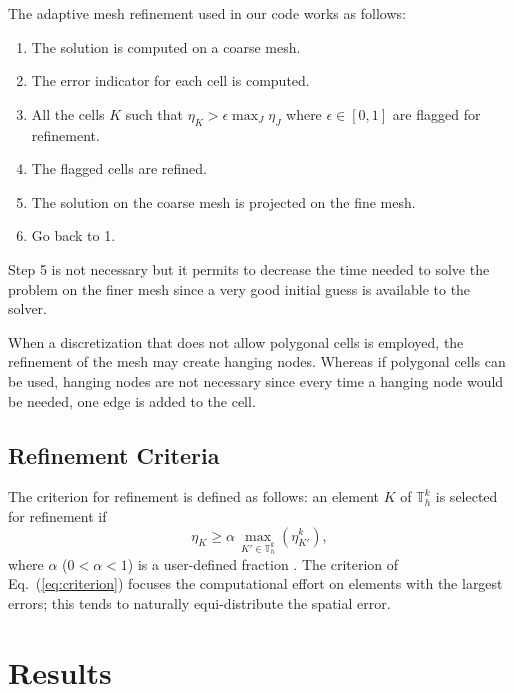\documentclass[preprint,10pt]{elsarticle}
\newcommand{\be}{\begin{equation}}
\newcommand{\ee}{\end{equation}}
\newcommand{\eqt}[1]{Eq.~(\ref{#1})}                     %
\renewcommand{\(}{\left(}
\renewcommand{\)}{\right)}
\renewcommand{\[}{\left[}
\renewcommand{\]}{\right]}
\begin{document}
The adaptive mesh refinement used in our code works as follows:
\begin{enumerate}
  \item The solution is computed on a coarse mesh.
  \item The error indicator for each cell is computed.
  \item All the cells $K$ such that $\eta_K > \epsilon \max_{J} \eta_J$ where
    $\epsilon \in [0,1]$ are flagged for refinement.
  \item The flagged cells are refined.
  \item The solution on the coarse mesh is projected on the fine mesh.
  \item Go back to 1.
\end{enumerate}
Step 5 is not necessary but it permits to decrease the time needed to solve
the problem on the finer mesh since a very good initial guess is available to
the solver.

When a discretization that does not allow polygonal cells is employed, the
refinement of the mesh may create hanging nodes. Whereas if polygonal cells can
be used, hanging nodes are not necessary since every time a hanging node
would be needed, one edge is added to the cell.


\subsection{Refinement Criteria} \label{sec:error4}

The criterion for refinement is defined as follows: an element $K$ of $\mathbb{T}_h^k$ is selected for refinement if
\be
\eta_{K} \ge \alpha \, \max_{K'\in \mathbb{T}_{h}^k} \left( \eta_{K'}^{k} \right),
\label{eq:criterion}
\ee
where $\alpha$ ($0 < \alpha < 1$) is a user-defined fraction .
The criterion of \eqt{eq:criterion} focuses the computational effort on
elements with the largest errors; this tends to naturally equi-distribute the spatial error.


 
\section{Results} \label{sec:results}
\end{document}
